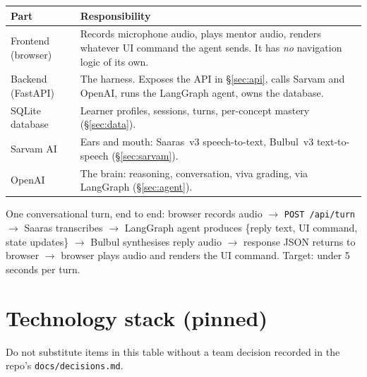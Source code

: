 \documentclass[11pt]{article}
\newcommand{\code}[1]{\texttt{#1}}
\begin{document}
\begin{center}
\begin{tabular}{p{3.2cm} p{10.6cm}}
\toprule
\textbf{Part} & \textbf{Responsibility} \\
\midrule
Frontend (browser) & Records microphone audio, plays mentor audio, renders whatever UI command the agent sends. It has \emph{no} navigation logic of its own. \\
Backend (FastAPI) & The harness. Exposes the API in \S\ref{sec:api}, calls Sarvam and OpenAI, runs the LangGraph agent, owns the database. \\
SQLite database & Learner profiles, sessions, turns, per-concept mastery (\S\ref{sec:data}). \\
Sarvam AI & Ears and mouth: Saaras~v3 speech-to-text, Bulbul~v3 text-to-speech (\S\ref{sec:sarvam}). \\
OpenAI & The brain: reasoning, conversation, viva grading, via LangGraph (\S\ref{sec:agent}). \\
\bottomrule
\end{tabular}
\end{center}

One conversational turn, end to end: browser records audio \(\rightarrow\) \code{POST /api/turn} \(\rightarrow\) Saaras transcribes \(\rightarrow\) LangGraph agent produces \{reply text, UI command, state updates\} \(\rightarrow\) Bulbul synthesises reply audio \(\rightarrow\) response JSON returns to browser \(\rightarrow\) browser plays audio and renders the UI command. Target: under 5 seconds per turn.

\section{Technology stack (pinned)}

Do not substitute items in this table without a team decision recorded in the repo's \code{docs/decisions.md}.
\end{document}

